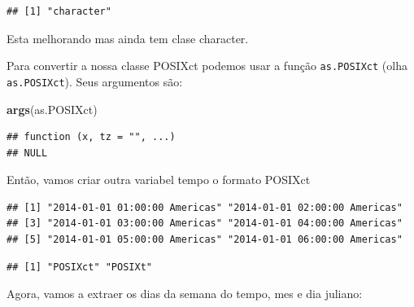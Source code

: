 \documentclass[]{book}
\newenvironment{Shaded}{\begin{snugshade}}{\end{snugshade}}
\newcommand{\KeywordTok}[1]{\textcolor[rgb]{0.13,0.29,0.53}{\textbf{#1}}}
\newcommand{\DataTypeTok}[1]{\textcolor[rgb]{0.13,0.29,0.53}{#1}}
\newcommand{\StringTok}[1]{\textcolor[rgb]{0.31,0.60,0.02}{#1}}
\newcommand{\OperatorTok}[1]{\textcolor[rgb]{0.81,0.36,0.00}{\textbf{#1}}}
\newcommand{\NormalTok}[1]{#1}
\theoremstyle{definition}
\theoremstyle{definition}
\theoremstyle{definition}
\theoremstyle{remark}
\begin{document}
\begin{verbatim}
## [1] "character"
\end{verbatim}

Esta melhorando mas ainda tem clase character.

Para convertir a nossa classe POSIXct podemos usar a função
\texttt{as.POSIXct} (olha \texttt{as.POSIXct}). Seus argumentos são:

\begin{Shaded}
\begin{Highlighting}[]
\KeywordTok{args}\NormalTok{(as.POSIXct)}
\end{Highlighting}
\end{Shaded}

\begin{verbatim}
## function (x, tz = "", ...) 
## NULL
\end{verbatim}

Então, vamos criar outra variabel tempo o formato POSIXct

\begin{Shaded}
\end{Shaded}

\begin{verbatim}
## [1] "2014-01-01 01:00:00 Americas" "2014-01-01 02:00:00 Americas"
## [3] "2014-01-01 03:00:00 Americas" "2014-01-01 04:00:00 Americas"
## [5] "2014-01-01 05:00:00 Americas" "2014-01-01 06:00:00 Americas"
\end{verbatim}

\begin{Shaded}
\end{Shaded}

\begin{verbatim}
## [1] "POSIXct" "POSIXt"
\end{verbatim}

Agora, vamos a extraer os dias da semana do tempo, mes e dia juliano:
\end{document}
